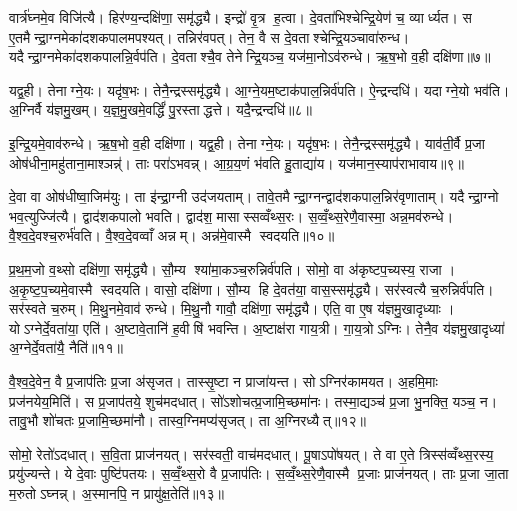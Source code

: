 वार्त्र॑घ्नमे॒व विजि॑त्यै। हिर॑ण्य॒न्दक्षि॑णा॒ समृ॑द्ध्यै। इन्द्रो॑ वृ॒त्र ह॒त्वा। दे॒वता॑भिश्चेन्द्रि॒येण॑ च॒ व्यार्ध्यत। स ए॒तमैन्द्रा॒ग्नमेका॑दशकपालमपश्यत्। तन्निर॑वपत्। तेन॒ वै स दे॒वताश्चेन्द्रि॒यञ्चावा॑रुन्ध। यदैन्द्रा॒ग्नमेका॑दशकपालन्नि॒र्वप॑ति। दे॒वताश्चै॒व तेनेन्द्रि॒यञ्च॒ यज॑मा॒नोऽव॑रुन्धे। ऋ॒ष॒भो व॒ही दक्षि॑णा॥७॥

यद्व॒ही। तेनाग्ने॒यः। यदृ॑ष॒भः। तेनै॒न्द्रस्समृ॑द्ध्यै। आ॒ग्ने॒यम॒ष्टाक॑पाल॒न्निर्व॑पति। ऐ॒न्द्रन्दधि॑। यदाग्ने॒यो भव॑ति। अ॒ग्निर्वै य॑ज्ञमु॒खम्। य॒ज्ञ॒मु॒खमे॒वर्द्धिं॑ पु॒रस्ताद्धत्ते। यदै॒न्द्रन्दधि॑॥८॥

इ॒न्द्रि॒यमे॒वाव॑रुन्धे। ऋ॒ष॒भो व॒ही दक्षि॑णा। यद्व॒ही। तेनाग्ने॒यः। यदृ॑ष॒भः। तेनै॒न्द्रस्समृ॑द्ध्यै। याव॑ती॒र्वै प्र॒जा ओष॑धीना॒महु॑ताना॒माश्ञन्न्॑। ताः परा॑ऽभवन्न्। आ॒ग्र॒य॒णं भ॑वति हु॒ताद्या॑य। यज॑मान॒स्याप॑राभावाय॥९॥

दे॒वा वा ओष॑धीष्वा॒जिम॑युः। ता इ॑न्द्रा॒ग्नी उद॑जयताम्। तावे॒तमैन्द्रा॒ग्नन्द्वाद॑शकपाल॒न्निर॑वृणाताम्। यदैन्द्रा॒ग्नो भव॒त्युज्जि॑त्यै। द्वाद॑शकपालो भवति। द्वाद॑श॒ मासास्सव्वँथ्स॒रः। स॒व्वँ॒थ्स॒रेणै॒वास्मा॒ अन्न॒मव॑रुन्धे। वै॒श्व॒दे॒वश्च॒रुर्भ॑वति। वै॒श्व॒दे॒वव्वाँ अन्नम्। अन्न॑मे॒वास्मै स्वदयति॥१०॥

प्र॒थ॒म॒जो व॒थ्सो दक्षि॑णा॒ समृ॑द्ध्यै। सौ॒म्य श्या॑मा॒कञ्च॒रुन्निर्व॑पति। सोमो॒ वा अ॑कृष्टप॒च्यस्य॒ राजा। अ॒कृ॒ष्ट॒प॒च्यमे॒वास्मै स्वदयति। वासो॒ दक्षि॑णा। सौ॒म्य हि दे॒वत॑या॒ वास॒स्समृ॑द्ध्यै। सर॑स्वत्यै च॒रुन्निर्व॑पति। सर॑स्वते च॒रुम्। मि॒थु॒नमे॒वाव॑ रुन्धे। मि॒थु॒नौ गावौ॒ दक्षि॑णा॒ समृ॑द्ध्यै। एति॒ वा ए॒ष य॑ज्ञमु॒खादृध्याः। योऽग्नेर्दे॒वता॑या॒ एति॑। अ॒ष्टावे॒तानि॑ ह॒वीषि॑ भवन्ति। अ॒ष्टाक्ष॑रा गाय॒त्री। गा॒य॒त्रोऽग्निः। तेनै॒व य॑ज्ञमु॒खादृध्या॑ अ॒ग्नेर्दे॒वता॑यै॒ नैति॑॥११॥


वै॒श्व॒दे॒वेन॒ वै प्र॒जाप॑तिः प्र॒जा अ॑सृजत। तास्सृ॒ष्टा न प्राजा॑यन्त। सोऽग्निर॑कामयत। अ॒हमि॒माः प्रज॑नयेय॒मिति॑। स प्र॒जाप॑तये॒ शुच॑मदधात्। सो॑ऽशोचत्प्र॒जामि॒च्छमा॑नः। तस्मा॒द्यञ्च॑ प्र॒जा भु॒नक्ति॒ यञ्च॒ न। तावु॒भौ शो॑चतः प्र॒जामि॒च्छमा॑नौ। तास्व॒ग्निमप्य॑सृजत्। ता अ॒ग्निरध्यैत्॥१२॥

सोमो॒ रेतो॑ऽदधात्। स॒वि॒ता प्राज॑नयत्। सर॑स्वती॒ वाच॑मदधात्। पू॒षाऽपो॑षयत्। ते वा ए॒ते त्रिस्स॑व्वँथ्स॒रस्य॒ प्रयु॑ज्यन्ते। ये दे॒वाः पुष्टि॑पतयः। स॒व्वँ॒थ्स॒रो वै प्र॒जाप॑तिः। स॒व्वँ॒थ्स॒रेणै॒वास्मै प्र॒जाः प्राज॑नयत्। ताः प्र॒जा जा॒ता म॒रुतोऽघ्नन्न्। अ॒स्मानपि॒ न प्रायु॑क्ष॒तेति॑॥१३॥

